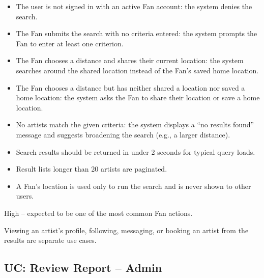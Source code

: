 \documentclass[11pt]{report}
\begin{document}
\begin{description}[leftmargin=2.2cm, style=nextline]
  \item[Extensions]
    \begin{itemize}
      \item[*a.] The user is not signed in with an active Fan account: the system denies the search.
      \item[3a.] The Fan submits the search with no criteria entered: the system prompts the Fan to enter at least one criterion.
      \item[3b.] The Fan chooses a distance and shares their current location: the system searches around the shared location instead of the Fan's saved home location.
      \item[3c.] The Fan chooses a distance but has neither shared a location nor saved a home location: the system asks the Fan to share their location or save a home location.
      \item[4a.] No artists match the given criteria: the system displays a ``no results found'' message and suggests broadening the search (e.g., a larger distance).
    \end{itemize}
  \item[Special Requirements]
    \begin{itemize}
      \item Search results should be returned in under 2 seconds for typical query loads.
      \item Result lists longer than 20 artists are paginated.
      \item A Fan's location is used only to run the search and is never shown to other users.
    \end{itemize}
  \item[Frequency of Occurrence] High -- expected to be one of the most common Fan actions.
  \item[Notes] Viewing an artist's profile, following, messaging, or booking an artist from the results are separate use cases.
\end{description}

\subsection{UC: Review Report -- Admin}
\end{document}
